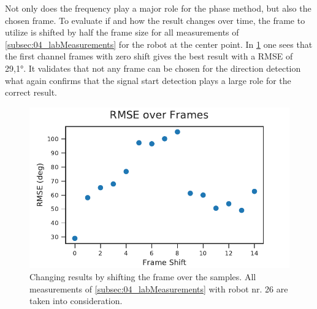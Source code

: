 Not only does the frequency play a major role for the phase method,
but also the chosen frame.
To evaluate if and how the result changes over time, the frame to
utilize is shifted by half the frame size for all measurements
of \cref{subsec:04_labMeasurements} for the robot at the center
point.
In \cref{fig:04_phaseOverTime} one sees that the first channel frames
with zero shift gives the best result with a \ac{RMSE} of 29,1\si{\degree}.
It validates that not any frame can be chosen for the
direction detection what again confirms that the signal start detection
plays a large role for the correct result.
\begin{figure}[ht]
	\centering
		\includegraphics[]{figures/evaluation/phase_over_time}
	\caption{Changing results by shifting the frame over the
	samples. All measurements of \cref{subsec:04_labMeasurements}
	with robot nr. 26 are taken into consideration.}
	\label{fig:04_phaseOverTime}
\end{figure}
